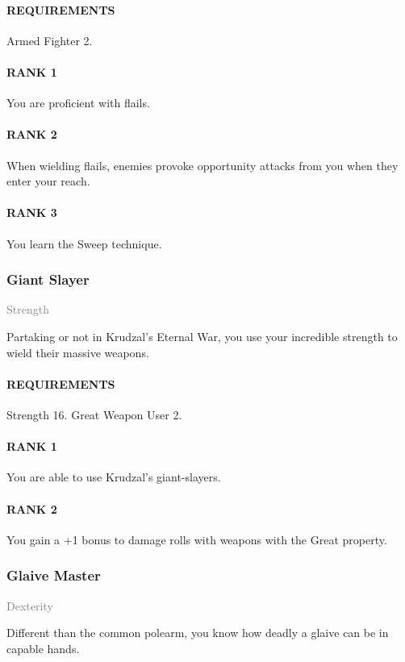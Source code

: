 \paragraph{REQUIREMENTS} Armed Fighter 2.
\paragraph{RANK 1} You are proficient with flails.
\paragraph{RANK 2} When wielding flails, enemies provoke opportunity attacks from you when they enter your reach.
\paragraph{RANK 3} You learn the Sweep technique.

\subsubsection{Giant Slayer} \label{feat::giantslayer}
\small{\textcolor{gray}{Strength}}

\normalsize
Partaking or not in Krudzal's Eternal War, you use your incredible strength to wield their massive weapons.
\paragraph{REQUIREMENTS} Strength 16. Great Weapon User 2.
\paragraph{RANK 1} You are able to use Krudzal's giant-slayers.
\paragraph{RANK 2} You gain a +1 bonus to damage rolls with weapons with the Great property.

\subsubsection{Glaive Master} \label{feat::glaivemaster}
\small{\textcolor{gray}{Dexterity}}

\normalsize
Different than the common polearm, you know how deadly a glaive can be in capable hands.
